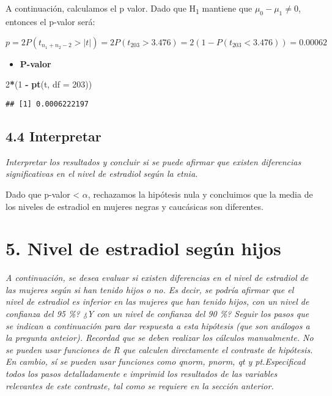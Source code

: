 \documentclass[
]{article}
\newenvironment{Shaded}{\begin{snugshade}}{\end{snugshade}}
\newcommand{\DataTypeTok}[1]{\textcolor[rgb]{0.13,0.29,0.53}{#1}}
\newcommand{\DecValTok}[1]{\textcolor[rgb]{0.00,0.00,0.81}{#1}}
\newcommand{\KeywordTok}[1]{\textcolor[rgb]{0.13,0.29,0.53}{\textbf{#1}}}
\newcommand{\NormalTok}[1]{#1}
\newcommand{\OperatorTok}[1]{\textcolor[rgb]{0.81,0.36,0.00}{\textbf{#1}}}
\newcommand{\StringTok}[1]{\textcolor[rgb]{0.31,0.60,0.02}{#1}}
\providecommand{\tightlist}{%
  \setlength{\itemsep}{0pt}\setlength{\parskip}{0pt}}
\begin{document}
A continuación, calculamos el p valor. Dado que H\textsubscript{1}
mantiene que \(\mu_0 - \mu_1 \neq 0\), entonces el p-valor será:

\[p = 2P(t_{n_1 + n_2 - 2} > |t|) = 2P(t_{203} > 3.476) = 2(1 - P(t_{203} < 3.476)) = 0.00062\]

\begin{itemize}
\tightlist
\item
  \textbf{P-valor}
\end{itemize}

\begin{Shaded}
\begin{Highlighting}[]
\DecValTok{2}\OperatorTok{*}\NormalTok{(}\DecValTok{1} \OperatorTok{-}\StringTok{ }\KeywordTok{pt}\NormalTok{(t, }\DataTypeTok{df =} \DecValTok{203}\NormalTok{))}
\end{Highlighting}
\end{Shaded}

\begin{verbatim}
## [1] 0.0006222197
\end{verbatim}

\hypertarget{interpretar}{%
\subsection{4.4 Interpretar}\label{interpretar}}

\emph{Interpretar los resultados y concluir si se puede afirmar que
existen diferencias significativas en el nivel de estradiol según la
etnia.}

Dado que p-valor \textless{} \(\alpha\), rechazamos la hipótesis nula y
concluimos que la media de los niveles de estradiol en mujeres negras y
caucásicas son diferentes.

\hypertarget{nivel-de-estradiol-seguxfan-hijos}{%
\section{5. Nivel de estradiol según
hijos}\label{nivel-de-estradiol-seguxfan-hijos}}

\emph{A continuación, se desea evaluar si existen diferencias en el
nivel de estradiol de las mujeres según si han tenido hijos o no. Es
decir, se podría afirmar que el nivel de estradiol es inferior en las
mujeres que han tenido hijos, con un nivel de confianza del 95 \%? ¿Y
con un nivel de confianza del 90 \%? Seguir los pasos que se indican a
continuación para dar respuesta a esta hipótesis (que son análogos a la
pregunta anteior). Recordad que se deben realizar los cálculos
manualmente. No se pueden usar funciones de R que calculen directamente
el contraste de hipótesis. En cambio, sí se pueden usar funciones como
qnorm, pnorm, qt y pt.Especificad todos los pasos detalladamente e
imprimid los resultados de las variables relevantes de este contraste,
tal como se requiere en la sección anterior.}
\end{document}

